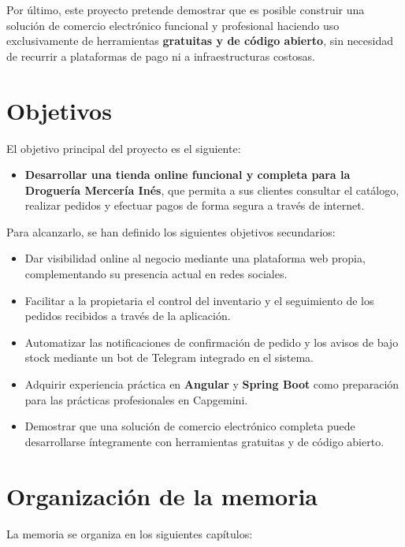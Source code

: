 Por último, este proyecto pretende demostrar que es posible construir una solución de comercio electrónico funcional y profesional haciendo uso exclusivamente de herramientas \textbf{gratuitas y de código abierto}, sin necesidad de recurrir a plataformas de pago ni a infraestructuras costosas.

\section{Objetivos}

El objetivo principal del proyecto es el siguiente:

\begin{itemize}
    \item \textbf{Desarrollar una tienda online funcional y completa para la Droguería Mercería Inés}, que permita a sus clientes consultar el catálogo, realizar pedidos y efectuar pagos de forma segura a través de internet.
\end{itemize}

Para alcanzarlo, se han definido los siguientes objetivos secundarios:

\begin{itemize}
    \item Dar visibilidad online al negocio mediante una plataforma web propia, complementando su presencia actual en redes sociales.
    \item Facilitar a la propietaria el control del inventario y el seguimiento de los pedidos recibidos a través de la aplicación.
    \item Automatizar las notificaciones de confirmación de pedido y los avisos de bajo stock mediante un bot de Telegram integrado en el sistema.
    \item Adquirir experiencia práctica en \textbf{Angular} y \textbf{Spring Boot} como preparación para las prácticas profesionales en Capgemini.
    \item Demostrar que una solución de comercio electrónico completa puede desarrollarse íntegramente con herramientas gratuitas y de código abierto.
\end{itemize}

\section{Organización de la memoria}

La memoria se organiza en los siguientes capítulos:

